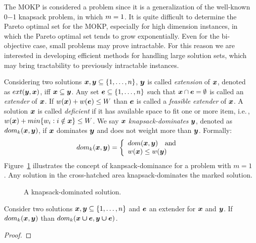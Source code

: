 The MOKP is considered a \nphard{} problem since it is a generalization
of the well-known 0$-$1 knapsack problem, in which $m = 1$.
It is quite difficult to determine the Pareto optimal set for the MOKP,
especially for high dimension instances, in which the 
Pareto optimal set tends to grow exponentially.
Even for the bi-objective case, small problems may prove intractable.
For this reason we are interested in developing efficient methods for
handling large solution sets, which may bring tractability to previously
intractable instances.

Considering two solutions $\boldsymbol{x}, \boldsymbol{y} \subseteq \{1, \ldots, n\}$, $\boldsymbol{y}$ is
called \emph{extension} of $\boldsymbol{x}$, denoted as $ext(\boldsymbol{y}, \boldsymbol{x})$,
iff $\boldsymbol{x} \subseteq \boldsymbol{y}$.
Any set $\boldsymbol{e} \subseteq \{1, \ldots, n\}$ such that $\boldsymbol{x} \cap \boldsymbol{e} = \emptyset$
is called an \emph{extender} of $\boldsymbol{x}$.
If $w(\boldsymbol{x}) + w(\boldsymbol{e}) \leq W$ than $\boldsymbol{e}$ is called a
\emph{feasible extender} of $\boldsymbol{x}$.
A solution $\boldsymbol{x}$ is called \emph{deficient} if it has available space
to fit one or more item, i.e.\,, $w(\boldsymbol{x}) + min\{ w_i : i \notin \boldsymbol{x} \} \leq W$.
We say
$\boldsymbol{x}$ \emph{knapsack-dominates} $\boldsymbol{y}$, denoted as $dom_k(\boldsymbol{x}, \boldsymbol{y})$,
if $\boldsymbol{x}$ dominates $\boldsymbol{y}$ and does not weight more than $\boldsymbol{y}$.
Formally:
\begin{displaymath}
  dom_k(\boldsymbol{x}, \boldsymbol{y}) = \left\{
    \begin{array}{l}
      dom(\boldsymbol{x}, \boldsymbol{y}) \quad \text{and} \\
      w(\boldsymbol{x}) \leq w(\boldsymbol{y})
    \end{array}
  \right.
\end{displaymath}
Figure~\ref{fig:kdom} illustrates the concept of kanpsack-dominance for a
problem with $m = 1$.
Any solution in the cross-hatched area knapsack-dominates the marked solution.
\begin{figure}
  
  \caption{A knapsack-dominated solution.}
  \label{fig:kdom}
\end{figure}

\begin{theorem}
  Consider two solutions $\boldsymbol{x}, \boldsymbol{y} \subseteq \{1, \ldots, n\}$
  and $\boldsymbol{e}$ an extender for $\boldsymbol{x}$ and $\boldsymbol{y}$.
  If $dom_k(\boldsymbol{x}, \boldsymbol{y})$ than $dom_k(\boldsymbol{x \cup e}, \boldsymbol{y \cup e})$.
\end{theorem}
\begin{proof}
  
\end{proof}


